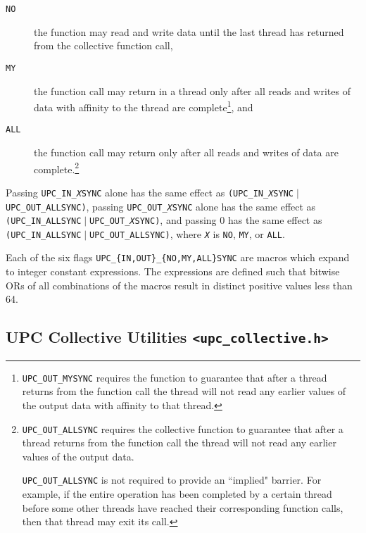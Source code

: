 \documentclass[12pt,titlepage]{article}
\newcounter{parnum}
\newcommand{\tab}{\textt{~~~~~~}}
\newcommand{\np}{
  \addtocounter{parnum}{1}
  \latex{\hspace{-2em}\makebox[2em][l]{\arabic{parnum}}}
  \html{{\bf {\arabic{parnum}}}\tab}}
\begin{document}
\begin{description}
    \item[{\tt NO}] the function may read and write data until
    the last thread has returned from the collective function call,

    \item[{\tt MY}] the function call may return in a thread
    only after all reads and writes of data with affinity to the thread
    are complete\footnote{{\tt UPC\_OUT\_MYSYNC} requires the 
  function to guarantee that after a thread returns from the
  function call the thread will not read any earlier values of the
  output data with affinity to that thread.}, and

    \item[{\tt ALL}] the function call may return only after
  all reads and writes of data are complete.\footnote{{\tt UPC\_OUT\_ALLSYNC}
  requires the collective function to guarantee that after a thread returns
  from the function call the thread will not read any earlier
  values of the output data.

  {\tt UPC\_OUT\_ALLSYNC} is not required to provide an ``implied"
  barrier.  For example, if the entire operation has been
  completed by a certain thread before some other threads have reached
  their corresponding function calls, then that thread may exit its call.}
\end{description}

\np Passing {\tt UPC\_IN\_{\em X}SYNC} alone has the same effect as
   {\tt (UPC\_IN\_{\em X}SYNC}$\;|\;${\tt UPC\_OUT\_ALLSYNC)},
   passing {\tt UPC\_OUT\_{\em X}SYNC} alone has the same effect as
   {\tt (UPC\_IN\_ALLSYNC}$\;|\;${\tt UPC\_OUT\_{\em X}SYNC)},
   and passing 0 has the same effect as
   {\tt (UPC\_IN\_ALLSYNC}$\;|\;${\tt UPC\_OUT\_ALLSYNC)},
   where {\tt {\em X}} is {\tt NO}, {\tt MY}, or {\tt ALL}.
   
\np Each of the six flags {\tt UPC\_\{IN,OUT\}\_\{NO,MY,ALL\}SYNC} are
   macros which expand to integer constant expressions.  The expressions
   are defined such that bitwise ORs of all combinations of the macros result
   in distinct positive values less than 64.

\pagebreak
\subsection{UPC Collective Utilities {\tt <upc\_collective.h>}}
\label{upc-collective}
\end{document}

